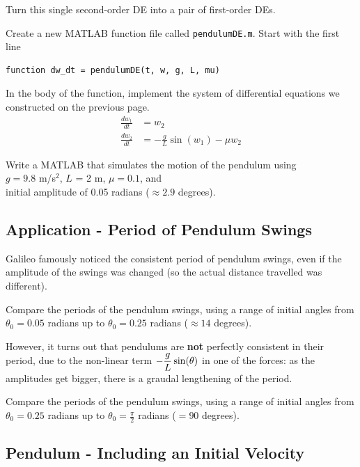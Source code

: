 \problem Turn this single second-order DE into a pair of first-order
DEs.

\newpage


\problem Create a new MATLAB function file called \texttt{pendulumDE.m}.
Start with the first line
\begin{verbatim}
function dw_dt = pendulumDE(t, w, g, L, mu) 
\end{verbatim}

In the body of the function, implement the system of differential
equations we constructed on the previous page.
\begin{align*}
  \frac{d w_1}{dt} & = w_2 \\
  \frac{d w_2}{dt} & = -\frac{g}{L}\sin(w_1)  - \mu w_2
\end{align*}
\vsc

\newpage

\problem Write a MATLAB that simulates the motion of the pendulum
using  \\
$g = 9.8$ m/s$^2$, $L$ = 2 m, $\mu = 0.1$, and \\
initial amplitude of 0.05 radians ($\approx 2.9$ degrees).


\newpage 
{}
\subsection*{Application - Period of Pendulum Swings}

Galileo famously noticed the consistent period of pendulum swings,
even if the amplitude of the swings was changed (so the actual
distance travelled was different).

\problem Compare the periods of the pendulum swings, using a range of
initial angles from $\theta_0 = 0.05$ radians up to $\theta_0 = 0.25$
radians ($\approx 14$ degrees).


\newpage
However, it turns out that pendulums are {\bf not} perfectly
consistent in their period, due to the non-linear term
$\displaystyle -\frac{g}{L} \sin(\theta)$ in one of the forces: as the
amplitudes get bigger, there is a graudal lengthening of the period.


\problem Compare the periods of the pendulum swings, using a range of
initial angles from $\theta_0 = 0.25$ radians up to $\theta_0 = \frac{\pi}{2}$
radians ($= 90$ degrees).

\newpage

\subsection*{Pendulum -  Including an Initial Velocity}

